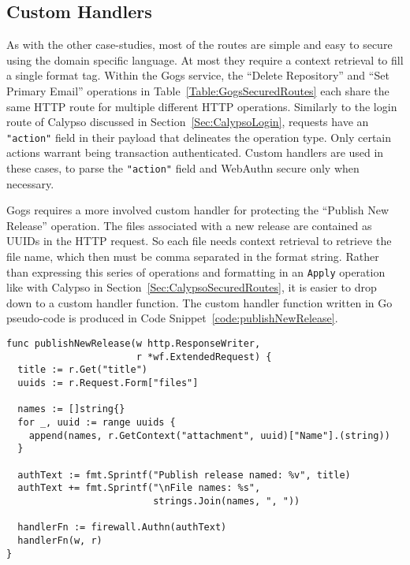 \subsection{Custom Handlers}\label{Sec:Gogs_CustomHandlers}

As with the other case-studies, most of the routes are simple and easy to secure using the domain specific language. At most they require a context retrieval to fill a single format tag. Within the Gogs service, the ``Delete Repository'' and ``Set Primary Email'' operations in Table~\ref{Table:GogsSecuredRoutes} each share the same HTTP route for multiple different HTTP operations. Similarly to the login route of Calypso discussed in Section~\ref{Sec:CalypsoLogin}, requests have an \lstinline{"action"} field in their payload that delineates the operation type. Only certain actions warrant being transaction authenticated. Custom handlers are used in these cases, to parse the \lstinline{"action"} field and WebAuthn secure only when necessary.



Gogs requires a more involved custom handler for protecting the ``Publish New Release'' operation. The files associated with a new release are contained as UUIDs in the HTTP request. So each file needs context retrieval to retrieve the file name, which then must be comma separated in the format string. Rather than expressing this series of operations and formatting in an \lstinline{Apply} operation like with Calypso in Section~\ref{Sec:CalypsoSecuredRoutes}, it is easier to drop down to a custom handler function. The custom handler function written in Go pseudo-code is produced in Code Snippet~\ref{code:publishNewRelease}.

\begin{lstlisting}[float=h,label=code:publishNewRelease,caption=A custom handler in Go pseudo-code to secure the Gogs operation for publishing a new release.]
func publishNewRelease(w http.ResponseWriter, 
                       r *wf.ExtendedRequest) {
  title := r.Get("title")
  uuids := r.Request.Form["files"]

  names := []string{}
  for _, uuid := range uuids {
    append(names, r.GetContext("attachment", uuid)["Name"].(string))
  }

  authText := fmt.Sprintf("Publish release named: %v", title)
  authText += fmt.Sprintf("\nFile names: %s", 
                          strings.Join(names, ", "))

  handlerFn := firewall.Authn(authText)
  handlerFn(w, r)
}
\end{lstlisting}

